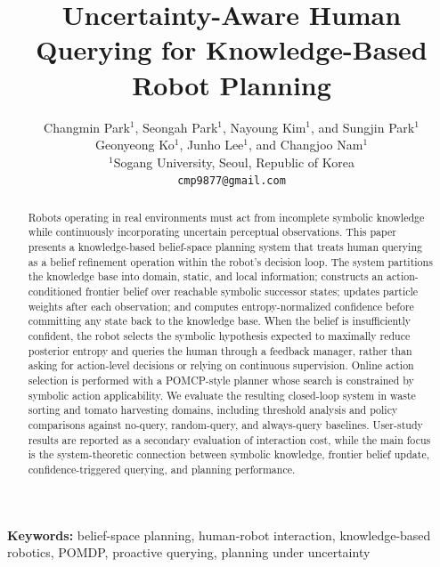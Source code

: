 \documentclass[12pt]{article}
\title{Uncertainty-Aware Human Querying for Knowledge-Based Robot Planning}
\author{
Changmin Park$^{1}$,
Seongah Park$^{1}$,
Nayoung Kim$^{1}$,
and Sungjin Park$^{1}$\\
Geonyeong Ko$^{1}$,
Junho Lee$^{1}$,
and Changjoo Nam$^{1}$\\
$^{1}$Sogang University, Seoul, Republic of Korea\\
\texttt{cmp9877@gmail.com}
}
\date{}
\begin{document}
\maketitle

\begin{abstract}
Robots operating in real environments must act from incomplete symbolic knowledge while continuously incorporating uncertain perceptual observations. This paper presents a knowledge-based belief-space planning system that treats human querying as a belief refinement operation within the robot's decision loop. The system partitions the knowledge base into domain, static, and local information; constructs an action-conditioned frontier belief over reachable symbolic successor states; updates particle weights after each observation; and computes entropy-normalized confidence before committing any state back to the knowledge base. When the belief is insufficiently confident, the robot selects the symbolic hypothesis expected to maximally reduce posterior entropy and queries the human through a feedback manager, rather than asking for action-level decisions or relying on continuous supervision. Online action selection is performed with a POMCP-style planner whose search is constrained by symbolic action applicability. We evaluate the resulting closed-loop system in waste sorting and tomato harvesting domains, including threshold analysis and policy comparisons against no-query, random-query, and always-query baselines. User-study results are reported as a secondary evaluation of interaction cost, while the main focus is the system-theoretic connection between symbolic knowledge, frontier belief update, confidence-triggered querying, and planning performance.
\end{abstract}

\noindent\textbf{Keywords:} belief-space planning, human-robot interaction, knowledge-based robotics, POMDP, proactive querying, planning under uncertainty












\appendix

\end{document}
